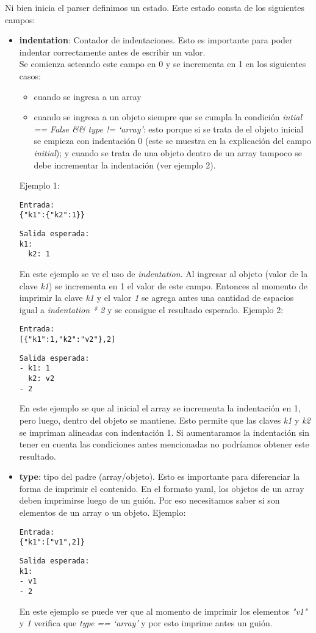 Ni bien inicia el parser definimos un estado. Este estado consta de los siguientes campos:

\begin{itemize}
    \item \textbf{indentation}: Contador de indentaciones. Esto es importante para poder indentar correctamente antes de escribir un valor.\\
    Se comienza seteando este campo en 0 y se incrementa en 1 en los siguientes casos:
    \begin{itemize}
      \item cuando se ingresa a un array
      \item cuando se ingresa a un objeto siempre que se cumpla la condición \textit{intial == False \&\& type != `array'}: esto porque si se trata de el objeto inicial se empieza con indentación 0 (este se muestra en la explicación del campo \textit{initial}); y cuando se trata de una objeto dentro de un array tampoco se debe incrementar la indentación (ver ejemplo 2).
    \end{itemize}
    Ejemplo 1:
    \begin{verbatim}
Entrada:
{"k1":{"k2":1}}
    \end{verbatim}
    \begin{verbatim}
Salida esperada:
k1:
  k2: 1
    \end{verbatim}
    En este ejemplo se ve el uso de \textit{indentation}. Al ingresar al objeto (valor de la clave \textit{k1}) se incrementa en 1 el valor de este campo. Entonces al momento de imprimir la clave \textit{k1} y el valor \textit{1} se agrega antes una cantidad de espacios igual a \textit{indentation * 2} y se consigue el resultado esperado.
    Ejemplo 2:
    \begin{verbatim}
Entrada:
[{"k1":1,"k2":"v2"},2]
    \end{verbatim}
    \begin{verbatim}
Salida esperada:
- k1: 1
  k2: v2
- 2
    \end{verbatim}
    En este ejemplo se que al inicial el array se incrementa la indentación en 1, pero luego, dentro del objeto se mantiene. Esto permite que las claves \textit{k1} y \textit{k2} se impriman alineadas con indentación 1. Si aumentaramos la indentación sin tener en cuenta las condiciones antes mencionadas no podríamos obtener este resultado.

    \item \textbf{type}: tipo del padre (array/objeto). Esto es importante para diferenciar la forma de imprimir el contenido. En el formato yaml, los objetos de un array deben imprimirse luego de un guión. Por eso necesitamos saber si son elementos de un array o un objeto.
    Ejemplo:
    \begin{verbatim}
Entrada:
{"k1":["v1",2]}
    \end{verbatim}
    \begin{verbatim}
Salida esperada:
k1:
- v1
- 2
    \end{verbatim}
    En este ejemplo se puede ver que al momento de imprimir los elementos \textit{"v1"} y \textit{1} verifica que \textit{type == `array'} y por esto imprime antes un guión.


\end{itemize}
